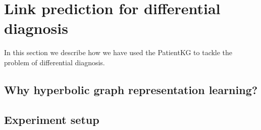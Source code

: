 

\section{Link prediction for differential diagnosis}\label{sec:linkPredictionDiffDiagnosis}
In this section we describe how we have used the PatientKG to tackle the problem of differential diagnosis. 

\subsection{Why hyperbolic graph representation learning?}\label{sec:hypPatientKG}

\subsection{Experiment setup}
